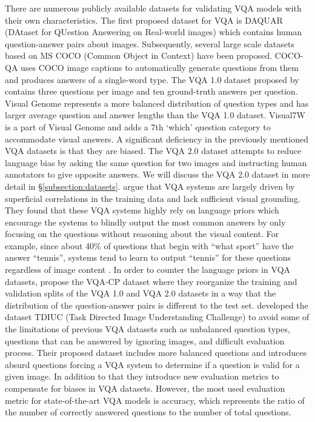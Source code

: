 \documentclass{article}
\begin{document}
There are numerous publicly available datasets for validating VQA models with their own characteristics. The first proposed dataset for VQA is DAQUAR (DAtaset for QUestion Answering on Real-world images) \citep{malinowski2014vqa} which contains human question-answer pairs about images. Subsequently, several large scale datasets based on MS COCO (Common Object in Context) \citep{coco} have been proposed. COCO-QA \citet{ren2015exploring} uses COCO image captions to automatically generate questions from them and produces answers of a single-word type. The VQA 1.0 dataset proposed by \citet{antol2015vqa} contains three questions per image and ten ground-truth answers per question. Visual Genome \citep{krishnavisualgenome} represents a more balanced distribution of question types and has larger average question and answer lengths than the VQA 1.0 dataset. Visual7W \citep{zhu2016cvpr} is a part of Visual Genome and adds a 7th `which' question category to accommodate visual answers. A significant deficiency in the previously mentioned VQA datasets is that they are biased. The VQA 2.0 dataset \citep{goyal2017vqa2} attempts to reduce language bias by asking the same question for two images and instructing human annotators to give opposite answers. We will discuss the VQA 2.0 dataset in more detail in \S \ref{subsection:datasets}.
\citet{agrawal12018gvqa} argue that VQA systems are largely driven by superficial correlations in the training data and lack sufficient visual grounding. They found that these VQA systems highly rely on language priors which encourage the systems to blindly output the most common answers by only focusing on the questions without reasoning about the visual content. For example, since about 40\% of questions that begin with ``what sport'' have the answer ``tennis'', systems tend to learn to output ``tennis'' for these questions regardless of image content \citep{wu2019self}. In order to counter the language priors in VQA datasets, \citet{agrawal12018gvqa} propose the VQA-CP dataset where they reorganize the training and validation splits of the VQA 1.0 and VQA 2.0 datasets in a way that the distribution of the question-answer pairs is different to the test set.
\citet{kafle2017tdiuc} developed the dataset TDIUC (Task Directed Image Understanding Challenge) to avoid some of the limitations of previous VQA datasets such as unbalanced question types, questions that can be answered by ignoring images, and difficult evaluation process. Their proposed dataset includes more balanced questions and introduces absurd questions forcing a VQA system to determine if a question is valid for a given image. In addition to that they introduce new evaluation metrics to compensate for biases in VQA datasets. However, the most used evaluation metric for state-of-the-art VQA models is accuracy, which represents the ratio of the number of correctly answered questions to the number of total questions.
\end{document}
